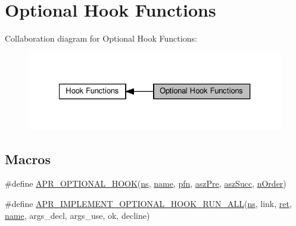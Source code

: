 \hypertarget{group__APR__Util__OPT__HOOK}{}\section{Optional Hook Functions}
\label{group__APR__Util__OPT__HOOK}
Collaboration diagram for Optional Hook Functions\+:
\nopagebreak
\begin{figure}[H]
\begin{center}
\leavevmode
\includegraphics[width=327pt]{group__APR__Util__OPT__HOOK}
\end{center}
\end{figure}
\subsection*{Macros}
\begin{DoxyCompactItemize}
\item 
\#define \hyperlink{group__APR__Util__OPT__HOOK_ga808d07f9a3e5df6517ba027972c79e4f}{A\+P\+R\+\_\+\+O\+P\+T\+I\+O\+N\+A\+L\+\_\+\+H\+O\+OK}(\hyperlink{group__APR__Util__RC_ga16ebca092e717a050cdb4feb7bb59849}{ns},  \hyperlink{pcre_8txt_a5a15d68aadb41c771fe50a27c400d49b}{name},  \hyperlink{group__APR__Util__OPT__HOOK_gaf7c6f7f4baf83622974409f8a1005cbf}{pfn},  \hyperlink{group__APR__Util__OPT__HOOK_ga2f4032a33578e8f22ed5dfc00f977f01}{asz\+Pre},  \hyperlink{group__APR__Util__OPT__HOOK_ga911d7939de58924edfe334834e1dc362}{asz\+Succ},  \hyperlink{group__APR__Util__OPT__HOOK_ga96979740ee3d327d0e03fff145daaacb}{n\+Order})
\item 
\#define \hyperlink{group__APR__Util__OPT__HOOK_ga3e6fa7b8e9ce140b26d8f6ce34e6ae82}{A\+P\+R\+\_\+\+I\+M\+P\+L\+E\+M\+E\+N\+T\+\_\+\+O\+P\+T\+I\+O\+N\+A\+L\+\_\+\+H\+O\+O\+K\+\_\+\+R\+U\+N\+\_\+\+A\+LL}(\hyperlink{group__APR__Util__RC_ga16ebca092e717a050cdb4feb7bb59849}{ns},  link,  \hyperlink{group__APACHE__MPM_ga794c48ec324a4d85a40f38fe264d2a41}{ret},  \hyperlink{pcre_8txt_a5a15d68aadb41c771fe50a27c400d49b}{name},  args\+\_\+decl,  args\+\_\+use,  ok,  decline)
\end{DoxyCompactItemize}
